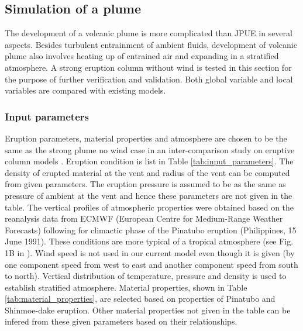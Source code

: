 \documentclass[journal abbreviation, manuscript]{copernicus}
\begin{document}
\subsection{Simulation of a plume}
The development of a volcanic plume is more complicated than JPUE in several aspects. Besides turbulent entrainment of ambient fluids, development of volcanic plume also involves heating up of entrained air and expanding in a stratified atmosphere. A strong eruption column without wind is tested in this section for the purpose of further verification and validation.
Both global variable and local variables are compared with existing models.

\subsubsection{Input parameters}
Eruption parameters, material properties and atmosphere are chosen to be the same as the strong plume no wind case in an inter-comparison study on eruptive column models \citep{costa2016results}. Eruption condition is list in Table \ref{tab:input_parameters}. The density of erupted material at the vent and radius of the vent can be computed from given parameters. The eruption pressure is assumed to be as the same as pressure of ambient at the vent and hence these parameters are not given in the table. The vertical profiles of atmospheric properties were obtained based on the reanalysis data from ECMWF (European Centre for Medium-Range Weather Forecasts) following \citet{costa2013density} for climactic phase of the Pinatubo eruption (Philippines, 15 June 1991). These conditions are more typical of a tropical atmosphere (see Fig. 1B in \citep{costa2016results}). Wind speed is not used in our current model even though it is given (by one component speed from west to east and another component speed from south to north). Vertical distribution of temperature, pressure and density is used to establish stratified atmosphere. Material properties, shown in Table \ref{tab:material_properties}, are selected based on properties of Pinatubo and Shinmoe-dake eruption. Other material properties not given in the table can be infered from these given parameters based on their relationships.
\end{document}
